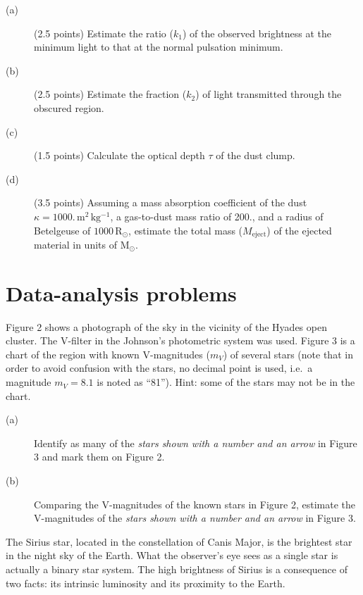 \begin{description}
\item[(a)] (2.5 points) Estimate the ratio ($k_1$) of the observed brightness
  at the minimum light to that at the normal pulsation minimum.
\item[(b)] (2.5 points) Estimate the fraction ($k_2$) of light transmitted
  through the obscured region.
\item[(c)] (1.5 points) Calculate the optical depth $\tau$ of the dust clump.
\item[(d)] (3.5 points) Assuming a mass absorption coefficient of the dust
  $\kappa = 1000.\,\mathrm{m^2\,kg^{-1}}$, a gas-to-dust mass ratio of 200.,
  and a radius of Betelgeuse of $1000\,\mathrm{R}_\odot$, estimate the total
  mass ($M_{\mathrm{eject}}$) of the ejected material in units of
  $\mathrm{M}_\odot$.
\end{description}

\section*{Data-analysis problems}

Figure 2 shows a photograph of the sky in the vicinity of the Hyades open
cluster. The V-filter in the Johnson's photometric system was used. Figure 3
is a chart of the region with known V-magnitudes ($m_V$) of several stars
(note that in order to avoid confusion with the stars, no decimal point is
used, i.e.\ a magnitude $m_V = 8.1$ is noted as ``81''). Hint: some of the
stars may not be in the chart.

\begin{description}
\item[(a)] Identify as many of the \emph{stars shown with a number and an
  arrow} in Figure 3 and mark them on Figure 2.
\item[(b)] Comparing the V-magnitudes of the known stars in Figure 2, estimate
  the V-magnitudes of the \emph{stars shown with a number and an arrow} in
  Figure 3.
\end{description}



The Sirius star, located in the constellation of Canis Major, is the brightest
star in the night sky of the Earth. What the observer's eye sees as a single
star is actually a binary star system. The high brightness of Sirius is a
consequence of two facts: its intrinsic luminosity and its proximity to the
Earth.

